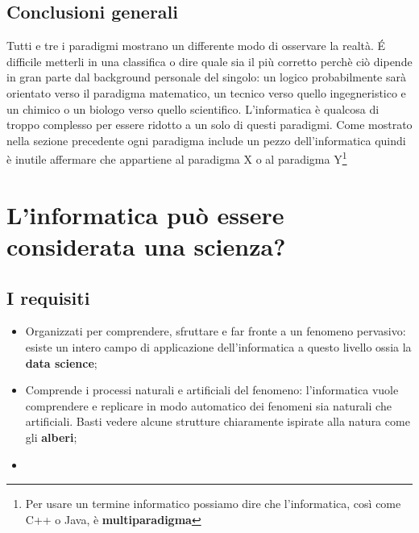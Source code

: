 \subsection{Conclusioni generali}

Tutti e tre i paradigmi mostrano un differente modo di osservare la realtà. É difficile metterli in una classifica o dire quale sia il più corretto perchè ciò dipende in gran parte dal background personale del singolo: un logico probabilmente sarà orientato verso il paradigma matematico, un tecnico verso quello ingegneristico e un chimico o un biologo verso quello scientifico. L'informatica è qualcosa di troppo complesso per essere ridotto a un solo di questi paradigmi. Come mostrato nella sezione precedente ogni paradigma include un pezzo dell'informatica quindi è inutile affermare che appartiene al paradigma X o al paradigma Y\footnote{Per usare un termine informatico possiamo dire che l'informatica, così come C++ o Java, è \textbf{multiparadigma}}

\section{L'informatica può essere considerata una scienza?}

\subsection{I requisiti}

\begin{itemize}
    \item Organizzati per comprendere, sfruttare e far fronte a un fenomeno pervasivo: esiste un intero campo di applicazione dell'informatica a questo livello ossia la \textbf{data science};
    \item Comprende i processi naturali e artificiali del fenomeno: l'informatica vuole comprendere e replicare in modo automatico dei fenomeni sia naturali che artificiali. Basti vedere alcune strutture chiaramente ispirate alla natura come gli \textbf{alberi}; 
    \item
\end{itemize}